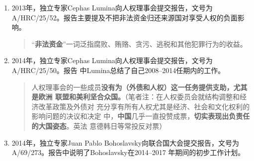 \begin{enumerate}
\begin{quotation}
    \textbf{二十国承诺抵制所有保护主义措施}，并纠正任何在应对全球金融危机中所采取
    的保护主义措施。但2008世界贸易自危机开始以来\textbf{只废除了一小部分已经实施
      的贸易限制}。迄今实施的贸易限制已影响到将近 3\%的世界贸易。遭到\textbf{保护
      主义措施}的影响。

    如独立专家在提交人权理事会的报告(A/HRC/23/37)中所指出，\textbf{债务减免的直接
      财政影响难以衡量，债务减免与减贫支出增加之间的因果关系也难以确定}。

    债务减免机制已经\textbf{完全为债权人所主导}，过度侧重于纠正被视为是受援国方面
    不慎重的债务管理，没有债务解决问题的根本原因，包括不公平的贸易条件、不负责任
    的贷款和国际金融机构不当的政策规定。

    目标 8 下的其他具体目标包括加强在发展中国家提供负担得起的基本药物和新技术(特
    别是信息和通信技术)。增加提供负担得起的基本药物对实现与卫生有关的千年发展目标
    和实现健康权十分重要。……但是，根据跟踪实现千年发展目标进展情况的报告，近年
    来发展中国家在改善基本药物的提供和负担能力方面进展甚微。根据《千年发展目标差
    距工作队2012 年报告》，2007--2011年期间平均只有51.8\%的公共保健设施和68.5\%的
    私营保健设施提供基本药物。
   \end{quotation}

\item 2013年，独立专家Cephas Lumina向人权理事会提交报告，文号为A/HRC/25/52。报告主要提及不把非法资金归还来源国对享受人权的负面影响。
  \begin{quotation} “\textbf{非法资金}”一词泛指腐败、贿赂、贪污、逃税和其他犯罪行为的收益。
  \end{quotation}

\item 2014年，独立专家Cephas Lumina向人权理事会提交报告，文号为A/HRC/25/50。报告
  中Lumina总结了自己2008--2014任期内的工作。
  \begin{quotation}
    人权理事会的一些成员\textbf{没有为（外债和人权）这一任务提供支助，尤其是欧洲
      联盟和美利坚合众国。}（笔者注：在人权委员会就结构调整和经济改革政策及外债对
    充分享有所有人权尤其是经济、社会和文化权利的影响问题的决议和决定
    中，\textbf{中国}几乎一直投赞成票，\textbf{切实表现出负责任的大国姿态}。英法
    意德韩日等常投反对票）
  \end{quotation}

\item 2014年，独立专家Juan Pablo Bohoslavsky向联合国大会提交报告，文号为A/69/273。报告中说明了Bohoslavsky在2014--2017 年期间的初步工作计划。


\end{enumerate}
